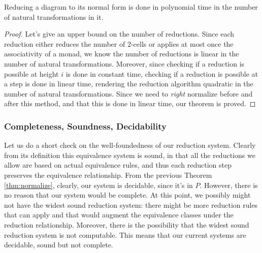 \begin{thm}
	\label{thm:normalize}
	Reducing a diagram to its normal form is done in polynomial time in
	the number of natural transformations in it.
\end{thm}
\begin{proof}
	Let's give an upper bound on the number of reductions.
	Since each reduction either reduces the number of $2$-cells or applies at
	most once the associativity of a monad, we know the number of reductions is
	linear in the	number of natural transformations.
	Moreover, since checking if a reduction is possible at height $i$ is done in
	constant time, checking if a reduction is possible at a step is done in
	linear time, rendering the reduction algorithm quadratic in the number of
	natural transformations.
	Since we need to \emph{right} normalize before and after this method, and
	that this is done in linear time, our theorem is proved.
\end{proof}

\subsubsection{Completeness, Soundness, Decidability}\label{subsubsec:sanity}
Let us do a short check on the well-foundedness of our reduction system.
Clearly from its definition this equivalence system is sound, in that all the
reductions we allow are based on actual equivalence rules, and thus each
reduction step preserves the equivalence relationship.
From the previous Theorem \ref{thm:normalize}, clearly, our system is
decidable, since it's in $P$.
However, there is no reason that our system would be complete.
At this point, we possibly might not have the widest sound reduction system:
there might be more reduction rules that can apply and that would
augment the equivalence classes under the reduction relationship.
Moreover, there is the possibility that the widest sound reduction system is
not computable.
This means that our current systems are decidable, sound but not complete.
